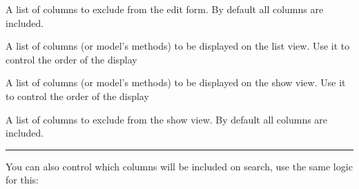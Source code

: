 \documentclass[letterpaper,10pt,english]{sphinxmanual}
\begin{document}
\begin{fulllineitems}

\begin{fulllineitems}
\label{quickhowto:flask.ext.appbuilder.baseviews.BaseCRUDView.edit_exclude_columns}
A list of columns to exclude from the edit form. By default all columns are included.

\end{fulllineitems}


\begin{fulllineitems}
\label{quickhowto:flask.ext.appbuilder.baseviews.BaseCRUDView.list_columns}
A list of columns (or model's methods) to be displayed on the list view.
Use it to control the order of the display

\end{fulllineitems}


\begin{fulllineitems}
\label{quickhowto:flask.ext.appbuilder.baseviews.BaseCRUDView.show_columns}
A list of columns (or model's methods) to be displayed on the show view.
Use it to control the order of the display

\end{fulllineitems}


\begin{fulllineitems}
\label{quickhowto:flask.ext.appbuilder.baseviews.BaseCRUDView.show_exclude_columns}
A list of columns to exclude from the show view. By default all columns are included.

\end{fulllineitems}


\end{fulllineitems}



\bigskip\hrule{}\bigskip


You can also control which columns will be included on search, use the same logic for this:
\label{quickhowto:module-flask.ext.appbuilder.baseviews}
\end{document}

